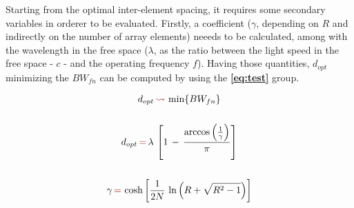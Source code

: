 \documentclass[10pt,a4paper,twocolumn]{article}
\begin{document}
{\indent 

Starting from the optimal inter-element spacing, it requires some secondary variables in orderer to be evaluated. Firstly, a coefficient ($\gamma$, depending on $R$ and indirectly on the number of array elements) neeeds to be calculated, among with the wavelength in the free space ($\lambda$, as the ratio between the light speed in the free space - $c$ - and the operating frequency $f$). Having those quantities, $d_{opt}$ minimizing the $BW_{fn}$ can be computed by using the \textbf{\cref{eq:test}} group. 

{\begin{equation}
		\begin{gathered}
			d_{opt}\,{\color{Mahogany}\leadsto}\,\min\{BW_{fn}\}\\
			\\
			d_{opt}\,{\color{Mahogany}=}\,\lambda\,\left[1\,-\,\frac{\arccos\left(\frac{1}{\gamma}\right)}{\pi}\right]\\
			\\
			\gamma\,{\color{Mahogany}=}\,\cosh\left[\frac{1}{2N}\,\ln\left(R+\sqrt{R^2-1}\right)\right]
		\end{gathered}
		\label{eq:test}
	\end{equation}
}


}
\end{document}
